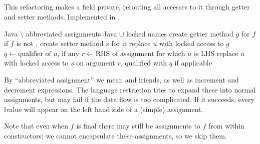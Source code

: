 \subsection{}
This refactoring makes a field private, rerouting all accesses to it through getter and setter methods. Implemented in .

\begin{algorithm}
\caption{$\refactoring{Self-Encapsulate Field}(f : \type{Field})$}
\begin{algorithmic}[1]
\REQUIRE Java $\setminus$ abbreviated assignments
\ENSURE Java $\cup$ locked names
\medskip
\STATE create getter method $g$ for $f$
\STATE if $f$ is not , create setter method $s$ for it
      \STATE replace $u$ with locked access to $g$
    \ELSE
        \STATE $q \leftarrow \text{qualifier of $u$, if any}$
        \STATE $r \leftarrow \text{RHS of assignment for which $u$ is LHS}$
        \STATE replace $u$ with locked access to $s$ on argument $r$, qualified with $q$ if applicable
      \ENDIF
    \ENDIF
  \ENDIF
\ENDFOR
\end{algorithmic}
\end{algorithm}

By ``abbreviated assignment'' we mean  and friends, as well as increment and decrement expressions. The language restriction tries to expand these into normal assignments, but may fail if the data flow is too complicated. If it succeeds, every lvalue will appear on the left hand side of a (simple) assignment.

Note that even when $f$ is final there may still be assignments to $f$ from within constructors; we cannot encapsulate these assignments, so we skip them.
